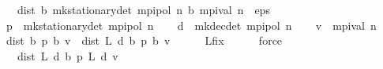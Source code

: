 \begin{isabellebody}
\ \ \ {\isachardoublequoteopen}dist\ {\isacharparenleft}{\kern0pt}{\isasymnu}\isactrlsub b\ {\isacharparenleft}{\kern0pt}mk{\isacharunderscore}{\kern0pt}stationary{\isacharunderscore}{\kern0pt}det\ {\isacharparenleft}{\kern0pt}mpi{\isacharunderscore}{\kern0pt}pol\ n{\isacharparenright}{\kern0pt}{\isacharparenright}{\kern0pt}{\isacharparenright}{\kern0pt}\ {\isacharparenleft}{\kern0pt}{\isasymL}\isactrlsub b\ {\isacharparenleft}{\kern0pt}mpi{\isacharunderscore}{\kern0pt}val\ n{\isacharparenright}{\kern0pt}{\isacharparenright}{\kern0pt}\ {\isasymle}\ eps\ {\isacharslash}{\kern0pt}\ {}{\isachardoublequoteclose}\isanewline
%
\isadelimproof
%
\endisadelimproof
%
\isatagproof
{}\isamarkupfalse%
\ {\isacharminus}{\kern0pt}\isanewline
\ \ \isamarkupfalse%
\ {\isacharquery}{\kern0pt}p\ {\isacharequal}{\kern0pt}\ {\isachardoublequoteopen}mk{\isacharunderscore}{\kern0pt}stationary{\isacharunderscore}{\kern0pt}det\ {\isacharparenleft}{\kern0pt}mpi{\isacharunderscore}{\kern0pt}pol\ n{\isacharparenright}{\kern0pt}{\isachardoublequoteclose}\isanewline
\ \ \isamarkupfalse%
\ {\isacharquery}{\kern0pt}d\ {\isacharequal}{\kern0pt}\ {\isachardoublequoteopen}mk{\isacharunderscore}{\kern0pt}dec{\isacharunderscore}{\kern0pt}det\ {\isacharparenleft}{\kern0pt}mpi{\isacharunderscore}{\kern0pt}pol\ n{\isacharparenright}{\kern0pt}{\isachardoublequoteclose}\isanewline
\ \ \isamarkupfalse%
\ {\isacharquery}{\kern0pt}v\ {\isacharequal}{\kern0pt}\ {\isachardoublequoteopen}mpi{\isacharunderscore}{\kern0pt}val\ n{\isachardoublequoteclose}\isanewline
\ \ \isamarkupfalse%
\ {\isachardoublequoteopen}dist\ {\isacharparenleft}{\kern0pt}{\isasymnu}\isactrlsub b\ {\isacharquery}{\kern0pt}p{\isacharparenright}{\kern0pt}\ {\isacharparenleft}{\kern0pt}{\isasymL}\isactrlsub b\ {\isacharquery}{\kern0pt}v{\isacharparenright}{\kern0pt}\ {\isacharequal}{\kern0pt}\ dist\ {\isacharparenleft}{\kern0pt}L\ {\isacharquery}{\kern0pt}d\ {\isacharparenleft}{\kern0pt}{\isasymnu}\isactrlsub b\ {\isacharquery}{\kern0pt}p{\isacharparenright}{\kern0pt}{\isacharparenright}{\kern0pt}\ {\isacharparenleft}{\kern0pt}{\isasymL}\isactrlsub b\ {\isacharquery}{\kern0pt}v{\isacharparenright}{\kern0pt}{\isachardoublequoteclose}\isanewline
\ \ \ \ \isamarkupfalse%
\ L{\isacharunderscore}{\kern0pt}{\isasymnu}{\isacharunderscore}{\kern0pt}fix\isanewline
\ \ \ \ \isamarkupfalse%
\ force\isanewline
\ \ \isamarkupfalse%
\ \isamarkupfalse%
\ {\isachardoublequoteopen}{\isasymdots}\ {\isacharequal}{\kern0pt}\ dist\ {\isacharparenleft}{\kern0pt}L\ {\isacharquery}{\kern0pt}d\ {\isacharparenleft}{\kern0pt}{\isasymnu}\isactrlsub b\ {\isacharquery}{\kern0pt}p{\isacharparenright}{\kern0pt}{\isacharparenright}{\kern0pt}\ {\isacharparenleft}{\kern0pt}L\ {\isacharquery}{\kern0pt}d\ {\isacharquery}{\kern0pt}v{\isacharparenright}{\kern0pt}{\isachardoublequoteclose}\isanewline

\end{isabellebody}
